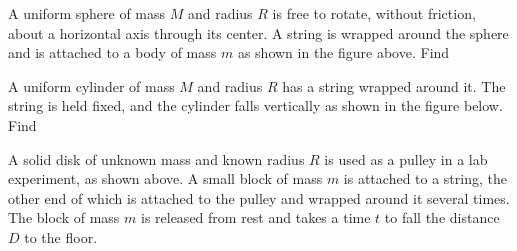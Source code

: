 \documentclass{../../oss-apphys-exam}
\newcounter{lastmc}
\newcounter{lastmc}
\begin{document}
\begin{questions}
  \setcounter{question}{\value{lastmc}}
  
  \question A uniform sphere of mass $M$ and radius $R$ is free to rotate,
  without friction, about a horizontal axis through its center. A string is
  wrapped around the sphere and is attached to a body of mass $m$ as shown in
  the figure above. Find
  \newpage

  \question A uniform cylinder of mass $M$ and radius $R$ has a string wrapped
  around it. The string is held fixed, and the cylinder falls vertically as
  shown in the figure below. Find
  \begin{center}
  \end{center}
  \newpage


  \question A solid disk of unknown mass and known radius $R$ is used as a
  pulley in a lab experiment, as shown above. A small block of mass $m$ is
  attached to a string, the other end of which is attached to the pulley and
  wrapped around it several times. The block of mass $m$ is released from rest
  and takes a time $t$ to fall the distance $D$ to the floor.
  \begin{parts}

\end{parts}
\end{questions}
\end{document}

